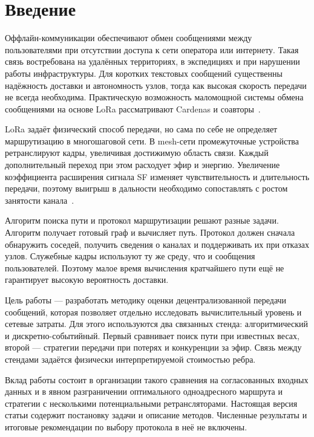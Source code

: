 \section{Введение}

Оффлайн-коммуникации обеспечивают обмен сообщениями между пользователями при отсутствии доступа к сети оператора или интернету. Такая связь востребована на удалённых территориях, в экспедициях и при нарушении работы инфраструктуры. Для коротких текстовых сообщений существенны надёжность доставки и автономность узлов, тогда как высокая скорость передачи не всегда необходима. Практическую возможность маломощной системы обмена сообщениями на основе LoRa рассматривают Cardenas и соавторы~\cite{cardenas}.

LoRa задаёт физический способ передачи, но сама по себе не определяет маршрутизацию в многошаговой сети. В mesh-сети промежуточные устройства ретранслируют кадры, увеличивая достижимую область связи. Каждый дополнительный переход при этом расходует эфир и энергию. Увеличение коэффициента расширения сигнала SF изменяет чувствительность и длительность передачи, поэтому выигрыш в дальности необходимо сопоставлять с ростом занятости канала~\cite{semtech}.

Алгоритм поиска пути и протокол маршрутизации решают разные задачи. Алгоритм получает готовый граф и вычисляет путь. Протокол должен сначала обнаружить соседей, получить сведения о каналах и поддерживать их при отказах узлов. Служебные кадры используют ту же среду, что и сообщения пользователей. Поэтому малое время вычисления кратчайшего пути ещё не гарантирует высокую вероятность доставки.

Цель работы --- разработать методику оценки децентрализованной передачи сообщений, которая позволяет отдельно исследовать вычислительный уровень и сетевые затраты. Для этого используются два связанных стенда: алгоритмический и дискретно-событийный. Первый сравнивает поиск пути при известных весах, второй --- стратегии передачи при потерях и конкуренции за эфир. Связь между стендами задаётся физически интерпретируемой стоимостью ребра.

Вклад работы состоит в организации такого сравнения на согласованных входных данных и в явном разграничении оптимального одноадресного маршрута и стратегии с несколькими потенциальными ретрансляторами. Настоящая версия статьи содержит постановку задачи и описание методов. Численные результаты и итоговые рекомендации по выбору протокола в неё не включены.
